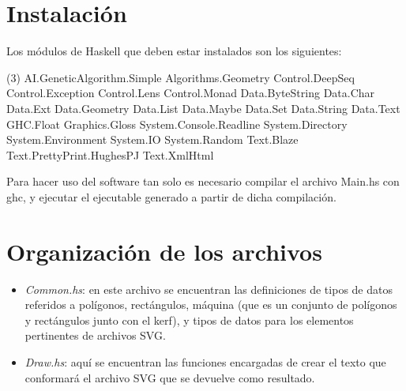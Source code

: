 \documentclass[a4paper,10pt]{article}
\begin{document}
\section*{Instalación}

\smallskip
    Los módulos de Haskell que deben estar instalados son los siguientes:

\normalsize
\begin{tasks}(3)
    \task[+] AI.GeneticAlgorithm.Simple
    \task[+] Algorithms.Geometry
    \task[+] Control.DeepSeq
    \task[+] Control.Exception
    \task[+] Control.Lens
    \task[+] Control.Monad
    \task[+] Data.ByteString
    \task[+] Data.Char
    \task[+] Data.Ext
    \task[+] Data.Geometry
    \task[+] Data.List
    \task[+] Data.Maybe
    \task[+] Data.Set
    \task[+] Data.String
    \task[+] Data.Text
    \task[+] GHC.Float
    \task[+] Graphics.Gloss
    \task[+] System.Console.Readline
    \task[+] System.Directory
    \task[+] System.Environment
    \task[+] System.IO
    \task[+] System.Random
    \task[+] Text.Blaze
    \task[+] Text.PrettyPrint.HughesPJ
    \task[+] Text.XmlHtml
\end{tasks}

\large
    Para hacer uso del software tan solo es necesario compilar el archivo Main.hs con ghc, y ejecutar el
    ejecutable generado a partir de dicha compilación.  

\section*{Organización de los archivos}
\begin{itemize}
    \item \textit{Common.hs}: en este archivo se encuentran las definiciones de tipos de datos referidos a
    polígonos, rectángulos, máquina (que es un conjunto de polígonos y rectángulos junto con el kerf), y tipos
    de datos para los elementos pertinentes de archivos SVG.
    \item \textit{Draw.hs}: aquí se encuentran las funciones encargadas de crear el texto que conformará el
    archivo SVG que se devuelve como resultado.
\end{itemize}
\end{document}
